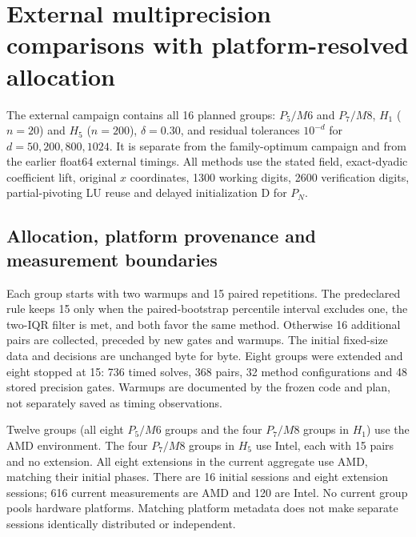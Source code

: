 \documentclass[11pt]{article}
\begin{document}
\clearpage
\section{External multiprecision comparisons with platform-resolved allocation}\label{sec:external-mp}
The external campaign contains all 16 planned groups: $P_5/M6$ and $P_7/M8$, $H_1$ ($n=20$) and $H_5$ ($n=200$), $\delta=0.30$, and residual tolerances $10^{-d}$ for $d=50,200,800,1024$. It is separate from the family-optimum campaign and from the earlier float64 external timings. All methods use the stated field, exact-dyadic coefficient lift, original $x$ coordinates, 1300 working digits, 2600 verification digits, partial-pivoting LU reuse and delayed initialization D for $P_N$.

\subsection{Allocation, platform provenance and measurement boundaries}
Each group starts with two warmups and 15 paired repetitions. The predeclared rule keeps 15 only when the paired-bootstrap percentile interval excludes one, the two-IQR filter is met, and both favor the same method. Otherwise 16 additional pairs are collected, preceded by new gates and warmups. The initial fixed-size data and decisions are unchanged byte for byte. Eight groups were extended and eight stopped at 15: 736 timed solves, 368 pairs, 32 method configurations and 48 stored precision gates. Warmups are documented by the frozen code and plan, not separately saved as timing observations.

Twelve groups (all eight $P_5/M6$ groups and the four $P_7/M8$ groups in $H_1$) use the AMD environment. The four $P_7/M8$ groups in $H_5$ use Intel, each with 15 pairs and no extension. All eight extensions in the current aggregate use AMD, matching their initial phases. There are 16 initial sessions and eight extension sessions; 616 current measurements are AMD and 120 are Intel. No current group pools hardware platforms. Matching platform metadata does not make separate sessions identically distributed or independent.
\end{document}
